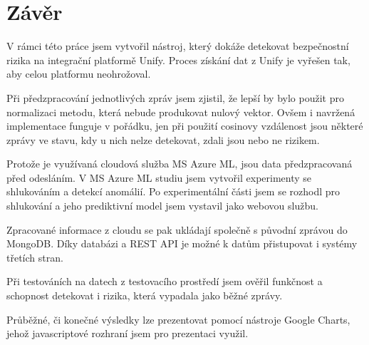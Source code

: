 \documentclass[thesis=M,czech]{FITthesis}[2012/10/20]
\begin{document}
\chapter{Závěr}
	V rámci této práce jsem vytvořil nástroj, který dokáže detekovat bezpečnostní rizika na integrační platformě Unify. Proces získání dat z Unify je vyřešen tak, aby celou platformu neohrožoval. 
	
	Při předzpracování jednotlivých zpráv jsem zjistil, že lepší by bylo použit pro normalizaci metodu, která nebude produkovat nulový vektor. Ovšem i navržená implementace funguje v pořádku, jen při použití cosinovy vzdálenost jsou některé zprávy ve stavu, kdy u nich nelze detekovat, zdali jsou nebo ne rizikem.
	
	Protože je využívaná cloudová služba MS Azure ML, jsou data předzpracovaná před odesláním. V MS Azure ML studiu jsem vytvořil experimenty se shlukováním a detekcí anomálií. Po experimentální části jsem se rozhodl pro shlukování a jeho prediktivní model jsem vystavil jako webovou službu. 
	
	Zpracované informace z cloudu se pak ukládají společně s původní zprávou do MongoDB. Díky databázi a REST API je možné k datům přistupovat i systémy třetích stran.
	
	Při testováních na datech z testovacího prostředí jsem ověřil funkčnost a schopnost detekovat i rizika, která vypadala jako běžné zprávy.
	
	Průběžné, či konečné výsledky lze prezentovat pomocí nástroje Google Charts, jehož javascriptové rozhraní jsem pro prezentaci využil.  
	





\appendix
\end{document}
